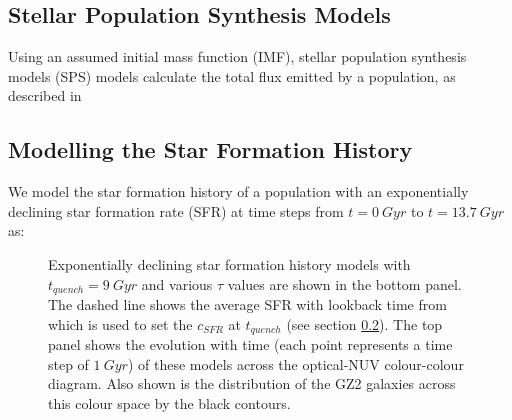 \documentclass{mn2e}
\begin{document}
\subsection{Stellar Population Synthesis Models}
Using an assumed initial mass function (IMF),  stellar population synthesis models (SPS) models calculate the total flux emitted by a population, as described in \cite{BC03}

\subsection{Modelling the Star Formation History}\label{sfh}
We model the star formation history of a population with an exponentially declining star formation rate (SFR) at time steps from $t =0 ~Gyr$ to $t=13.7 ~Gyr$ as:

\begin{figure}
\caption{Exponentially declining star formation history models with $t_{quench}=9~Gyr$ and various $\tau$ values are shown in the bottom panel. The dashed line shows the average SFR with lookback time from \cite{Peng} which is used to set the $c_{SFR}$ at $t_{quench}$ (see section \ref{sfh}). The top panel shows the evolution with time (each point represents a time step of $1 ~Gyr$) of these models across the optical-NUV colour-colour diagram. Also shown is the distribution of the GZ2 galaxies across this colour space by the black contours.}
\label{kev}
\end{figure}
\end{document}

